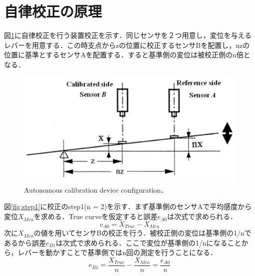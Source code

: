 \section{自律校正の原理}
図\ref{fig:校正系}に自律校正を行う装置校正を示す．同じセンサを２つ用意し，変位を与えるレバーを用意する．この時支点からzの位置に校正するセンサBを配置し，nzの位置に基準とするセンサAを配置する．すると基準側の変位は被校正側のn倍となる．
\begin{figure}[htbp]
    \centering %
    \includegraphics[width=100truemm,clip]{fig/fig_校正系.png}
    \caption{Autonomous calibration device configuration．}
    \label{fig:校正系}
\end{figure}

図\ref{fig:step1}に校正のstep1(n = 2)を示す．まず基準側のセンサAで平均感度から変位$X_{Mea}$を求める．True curveを仮定すると誤差$e_{A0}$は次式で求められる．
\begin{equation}
    e_{A0} = X_{True} - X_{Mea}
\end{equation}
次に$X_{Mea}$の値を用いてセンサBの校正を行う．被校正側の変位は基準側の1/nであるから誤差$e_{B1}$は次式で求められる．ここで変位が基準側の1/nになることから，レバーを動かすことで基準側ではn回の測定を行うことになる．
\begin{equation}
    e_{B1} = \frac{X_{True}}{n} - \frac{X_{Mea}}{n} = \frac{e_{A0}}{n}
    \label{eq:誤差B1}
\end{equation}

